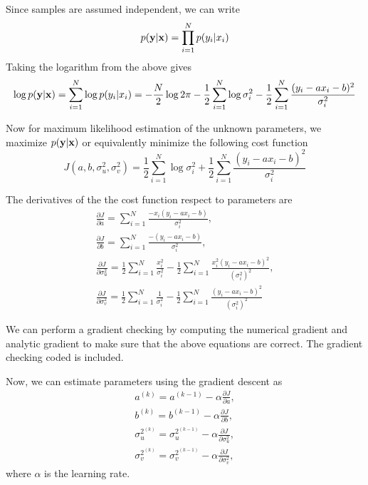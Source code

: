 \documentclass[12pt]{elsarticle}
\begin{document}
Since samples are assumed independent, we can write
\begin{equation}
\label{eq:ypdf}
p(\mathbf{y}|\mathbf{x})= \prod_{i=1}^{N} p(y_i|x_i)
\end{equation}
Taking the logarithm from the above gives
\begin{equation}
\label{eq:logp}
\log p(\mathbf{y}|\mathbf{x})= \sum \limits_{i=1}^{N} \log  p(y_i|x_i)=-\frac{N}{2} \log 2\pi - \frac{1}{2} \sum \limits_{i=1}^N  \log \sigma_i^2  - \frac{1}{2} \sum \limits_{i=1}^N \frac{(y_i-ax_i-b)^2}{\sigma_i^2}
\end{equation}

Now for maximum likelihood estimation of the unknown parameters, we maximize $p(\mathbf{y}|\mathbf{x})$ or equivalently minimize the following cost function
\begin{equation}
\label{eq:mle}
J(a,b,\sigma_u^2,\sigma_v^2)= \frac{1}{2} \sum \limits_{i=1}^N  \log \sigma_i^2 + \frac{1}{2} \sum \limits_{i=1}^N \frac{(y_i-ax_i-b)^2}{\sigma_i^2}
\end{equation}


The derivatives of the the cost function respect to parameters are
\begin{gather}
\label{eq:ja}
\frac{\partial  J}{\partial a}= \sum \limits_{i=1}^N \frac{-x_i (y_i-ax_i-b) }{\sigma_i^2},\\
\frac{\partial  J}{\partial b}= \sum \limits_{i=1}^N \frac{- (y_i-ax_i-b) }{\sigma_i^2}, \\
\frac{\partial  J}{\partial \sigma_u^2}= \frac{1}{2} \sum \limits_{i=1}^N \frac{x_i^2}{\sigma_i^2}
-\frac{1}{2} \sum \limits_{i=1}^N \frac{x_i^2(y_i-ax_i-b)^2}{(\sigma_i^2)^2},\\
\frac{\partial  J}{\partial \sigma_v^2}= \frac{1}{2} \sum \limits_{i=1}^N \frac{1}{\sigma_i^2}
-\frac{1}{2} \sum \limits_{i=1}^N \frac{(y_i-ax_i-b)^2}{(\sigma_i^2)^2}
\end{gather}

We can perform a gradient checking by computing the numerical gradient and analytic gradient to make sure that the above equations are correct. The gradient checking coded is included.

Now, we can estimate parameters using the gradient descent as
\begin{gather}
a^{(k)}=a^{(k-1)} - \alpha \frac{\partial J}{\partial a}, \\
b^{(k)}=b^{(k-1)} - \alpha \frac{\partial J}{\partial b}, \\
\sigma_u^{2^{(k)}}=\sigma_u^{2^{(k-1)}} - \alpha \frac{\partial J}{\partial \sigma_u^2}, \\
\sigma_v^{2^{(k)}}=\sigma_v^{2^{(k-1)}} - \alpha \frac{\partial J}{\partial \sigma_v^2},
\end{gather}
where $\alpha$ is the learning rate.
\end{document}
